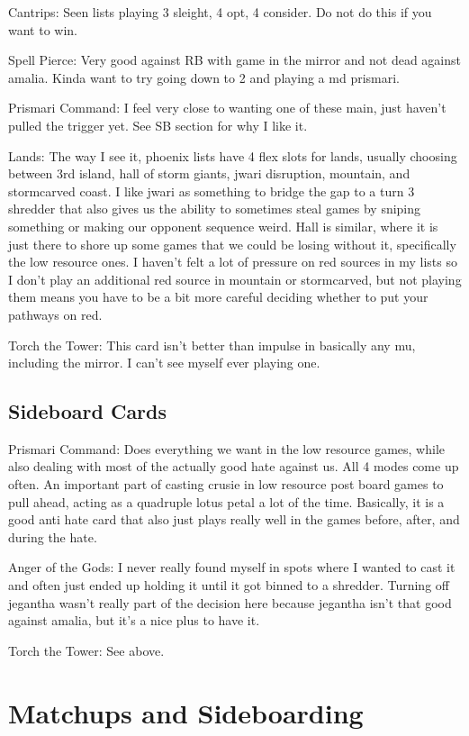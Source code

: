 \documentclass[12pt]{article}
\begin{document}
Cantrips:
Seen lists playing 3 sleight, 4 opt, 4 consider. Do not do this if you want to win.

Spell Pierce:
Very good against RB with game in the mirror and not dead against amalia. Kinda want to try going down to 2 and playing a md prismari.

Prismari Command:
I feel very close to wanting one of these main, just haven't pulled the trigger yet. See SB section for why I like it.

Lands:
The way I see it, phoenix lists have 4 flex slots for lands, usually choosing between 3rd island, hall of storm giants, jwari disruption, mountain, and stormcarved coast. I like jwari as something to bridge the gap to a turn 3 shredder that also gives us the ability to sometimes steal games by sniping something or making our opponent sequence weird. Hall is similar, where it is just there to shore up some games that we could be losing without it, specifically the low resource ones. I haven't felt a lot of pressure on red sources in my lists so I don't play an additional red source in mountain or stormcarved, but not playing them means you have to be a bit more careful deciding whether to put your pathways on red.

Torch the Tower:
This card isn't better than impulse in basically any mu, including the mirror. I can't see myself ever playing one.

\subsection{Sideboard Cards}
\label{sec:sbchoices}
Prismari Command:
Does everything we want in the low resource games, while also dealing with most of the actually good hate against us. All 4 modes come up often. An important part of casting crusie in low resource post board games to pull ahead, acting as a quadruple lotus petal a lot of the time. Basically, it is a good anti hate card that also just plays really well in the games before, after, and during the hate.

Anger of the Gods:
I never really found myself in spots where I wanted to cast it and often just ended up holding it until it got binned to a shredder. Turning off jegantha wasn't really part of the decision here because jegantha isn't that good against amalia, but it's a nice plus to have it.

Torch the Tower:
See above.


\clearpage
\section{Matchups and Sideboarding}
\end{document}
